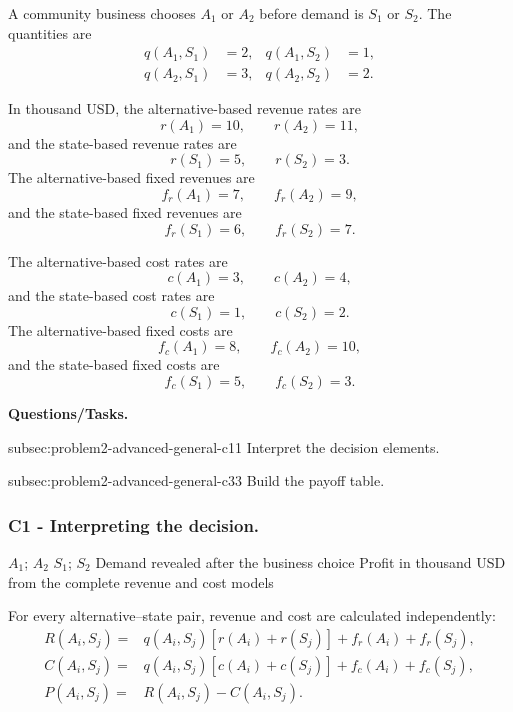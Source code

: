 A community business chooses \(A_1\) or \(A_2\) before demand is \(S_1\) or
\(S_2\). The quantities are
\[
\begin{aligned}
	q(A_1,S_1)&=2,
	&
	q(A_1,S_2)&=1,
	\\
	q(A_2,S_1)&=3,
	&
	q(A_2,S_2)&=2.
\end{aligned}
\]

In thousand USD, the alternative-based revenue rates are
\[
r(A_1)=10,
\qquad
r(A_2)=11,
\]
and the state-based revenue rates are
\[
r(S_1)=5,
\qquad
r(S_2)=3.
\]
The alternative-based fixed revenues are
\[
f_r(A_1)=7,
\qquad
f_r(A_2)=9,
\]
and the state-based fixed revenues are
\[
f_r(S_1)=6,
\qquad
f_r(S_2)=7.
\]

The alternative-based cost rates are
\[
c(A_1)=3,
\qquad
c(A_2)=4,
\]
and the state-based cost rates are
\[
c(S_1)=1,
\qquad
c(S_2)=2.
\]
The alternative-based fixed costs are
\[
f_c(A_1)=8,
\qquad
f_c(A_2)=10,
\]
and the state-based fixed costs are
\[
f_c(S_1)=5,
\qquad
f_c(S_2)=3.
\]

\textbf{Questions/Tasks.}
\begin{enumerate}
	\CriterionTask
	{subsec:problem2-advanced-general-c1}{1}
	{Interpret the decision elements.}

	\CriterionTask
	{subsec:problem2-advanced-general-c3}{3}
	{Build the payoff table.}
\end{enumerate}

\subsubsection*{C1 - Interpreting the decision.}
\label{subsec:problem2-advanced-general-c1}

\DecisionElementsTable
{\(A_1\); \(A_2\)}
{\(S_1\); \(S_2\)}
{Demand revealed after the business choice}
{Profit in thousand USD from the complete revenue and cost models}

For every alternative--state pair, revenue and cost are calculated independently:
\[
\begin{aligned}
	R(A_i,S_j)
	={}&
	q(A_i,S_j)
	\left[
	r(A_i)+r(S_j)
	\right]
	+
	f_r(A_i)
	+
	f_r(S_j),
	\\
	C(A_i,S_j)
	={}&
	q(A_i,S_j)
	\left[
	c(A_i)+c(S_j)
	\right]
	+
	f_c(A_i)
	+
	f_c(S_j),
	\\
	P(A_i,S_j)
	={}&
	R(A_i,S_j)-C(A_i,S_j).
\end{aligned}
\]


